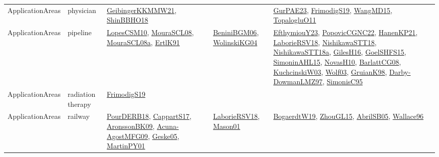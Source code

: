 {\begin{longtable}{lp{3cm}>{\raggedright}p{6cm}>{\raggedright}p{6cm}p{8cm}}
ApplicationAreas & physician & \href{papers/GeibingerKKMMW21.pdf}{GeibingerKKMMW21}\cite{GeibingerKKMMW21}, \href{articles/ShinBBHO18.pdf}{ShinBBHO18}\cite{ShinBBHO18} &  & \href{articles/GurPAE23.pdf}{GurPAE23}\cite{GurPAE23}, \href{papers/FrimodigS19.pdf}{FrimodigS19}\cite{FrimodigS19}, \href{articles/WangMD15.pdf}{WangMD15}\cite{WangMD15}, \href{articles/TopalogluO11.pdf}{TopalogluO11}\cite{TopalogluO11}\\
ApplicationAreas & pipeline & \href{articles/LopesCSM10.pdf}{LopesCSM10}\cite{LopesCSM10}, \href{papers/MouraSCL08.pdf}{MouraSCL08}\cite{MouraSCL08}, \href{papers/MouraSCL08a.pdf}{MouraSCL08a}\cite{MouraSCL08a}, \href{papers/ErtlK91.pdf}{ErtlK91}\cite{ErtlK91} & \href{papers/BeniniBGM06.pdf}{BeniniBGM06}\cite{BeniniBGM06}, \href{papers/WolinskiKG04.pdf}{WolinskiKG04}\cite{WolinskiKG04} & \href{papers/EfthymiouY23.pdf}{EfthymiouY23}\cite{EfthymiouY23}, \href{papers/PopovicCGNC22.pdf}{PopovicCGNC22}\cite{PopovicCGNC22}, \href{papers/HanenKP21.pdf}{HanenKP21}\cite{HanenKP21}, \href{articles/LaborieRSV18.pdf}{LaborieRSV18}\cite{LaborieRSV18}, \href{papers/NishikawaSTT18.pdf}{NishikawaSTT18}\cite{NishikawaSTT18}, \href{papers/NishikawaSTT18a.pdf}{NishikawaSTT18a}\cite{NishikawaSTT18a}, \href{papers/GilesH16.pdf}{GilesH16}\cite{GilesH16}, \href{articles/GoelSHFS15.pdf}{GoelSHFS15}\cite{GoelSHFS15}, \href{articles/SimoninAHL15.pdf}{SimoninAHL15}\cite{SimoninAHL15}, \href{articles/NovasH10.pdf}{NovasH10}\cite{NovasH10}, \href{papers/BarlattCG08.pdf}{BarlattCG08}\cite{BarlattCG08}, \href{articles/KuchcinskiW03.pdf}{KuchcinskiW03}\cite{KuchcinskiW03}, \href{papers/Wolf03.pdf}{Wolf03}\cite{Wolf03}, \href{papers/GruianK98.pdf}{GruianK98}\cite{GruianK98}, \href{articles/Darby-DowmanLMZ97.pdf}{Darby-DowmanLMZ97}\cite{Darby-DowmanLMZ97}, \href{papers/SimonisC95.pdf}{SimonisC95}\cite{SimonisC95}\\
ApplicationAreas & radiation therapy & \href{papers/FrimodigS19.pdf}{FrimodigS19}\cite{FrimodigS19} &  & \\
ApplicationAreas & railway & \href{articles/PourDERB18.pdf}{PourDERB18}\cite{PourDERB18}, \href{papers/CappartS17.pdf}{CappartS17}\cite{CappartS17}, \href{papers/AronssonBK09.pdf}{AronssonBK09}\cite{AronssonBK09}, \href{papers/Acuna-AgostMFG09.pdf}{Acuna-AgostMFG09}\cite{Acuna-AgostMFG09}, \href{papers/Geske05.pdf}{Geske05}\cite{Geske05}, \href{articles/MartinPY01.pdf}{MartinPY01}\cite{MartinPY01} & \href{articles/LaborieRSV18.pdf}{LaborieRSV18}\cite{LaborieRSV18}, \href{articles/Mason01.pdf}{Mason01}\cite{Mason01} & \href{papers/BogaerdtW19.pdf}{BogaerdtW19}\cite{BogaerdtW19}, \href{papers/ZhouGL15.pdf}{ZhouGL15}\cite{ZhouGL15}, \href{papers/AbrilSB05.pdf}{AbrilSB05}\cite{AbrilSB05}, \href{articles/Wallace96.pdf}{Wallace96}\cite{Wallace96}\\

\end{longtable}}
